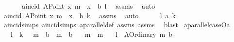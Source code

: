 \begin{isabellebody}
%
\endisadelimproof
%
\isatagproof
{}\isamarkupfalse%
\ {\isacharminus}{\kern0pt}\isanewline
\ \ \isamarkupfalse%
\ {}{\isacharcolon}{\kern0pt}\ {\isachardoublequoteopen}a{}incid\ {\isacharparenleft}{\kern0pt}A{}Point\ x{}\ {\isacharparenleft}{\kern0pt}m\ {\isacharasterisk}{\kern0pt}\ x{}\ {\isacharplus}{\kern0pt}\ b{\isacharparenright}{\kern0pt}{\isacharparenright}{\kern0pt}\ l{\isachardoublequoteclose}\ \isamarkupfalse%
\ assms\ \isamarkupfalse%
\ auto\isanewline
{}\isamarkupfalse%
\isanewline
\ \ \isamarkupfalse%
\ {}{\isacharcolon}{\kern0pt}{\isachardoublequoteopen}a{}incid\ {\isacharparenleft}{\kern0pt}A{}Point\ x{}\ {\isacharparenleft}{\kern0pt}m\ {\isacharasterisk}{\kern0pt}\ x{}\ {\isacharplus}{\kern0pt}\ b{\isacharparenright}{\kern0pt}{\isacharparenright}{\kern0pt}\ k{\isachardoublequoteclose}\ \isamarkupfalse%
\ assms\ \isamarkupfalse%
\ auto\isanewline
{}\isamarkupfalse%
\isanewline
\ \ \isamarkupfalse%
\ {\isachardoublequoteopen}\ {\isasymnot}\ l\ a{}{\isacharbar}{\kern0pt}{\isacharbar}{\kern0pt}\ k{\isachardoublequoteclose}\ \isanewline
\ \ \isamarkupfalse%
\ a{}incid{\isachardot}{\kern0pt}simps{\isacharparenleft}{\kern0pt}{}{\isacharparenright}{\kern0pt}\ a{}incid{\isachardot}{\kern0pt}simps{\isacharparenleft}{\kern0pt}{}{\isacharparenright}{\kern0pt}\ a{}parallel{\isacharunderscore}{\kern0pt}def\ assms{\isacharparenleft}{\kern0pt}{}{\isacharparenright}{\kern0pt}\ assms{\isacharparenleft}{\kern0pt}{}{\isacharparenright}{\kern0pt}\ \isamarkupfalse%
\ blast\isanewline
{}\isamarkupfalse%
%
\endisatagproof
{\isafoldproof}%
%
\isadelimproof
\isanewline
%
\endisadelimproof
\isanewline
\isanewline
{}\isamarkupfalse%
\ a{}parallel{\isacharunderscore}{\kern0pt}caseOa{\isacharcolon}{\kern0pt}\isanewline
\ \ \ l\ \ k\ \ \ m{}\ \ b{}\ \ m{}\ \ b{}\isanewline
\ \ \ {\isachardoublequoteopen}m{}\ {\isasymnoteq}\ m{}{\isachardoublequoteclose}\isanewline
\ \ \ {\isachardoublequoteopen}l\ {\isacharequal}{\kern0pt}\ A{}Ordinary\ m{}\ b{}{\isachardoublequoteclose}\isanewline

\end{isabellebody}
